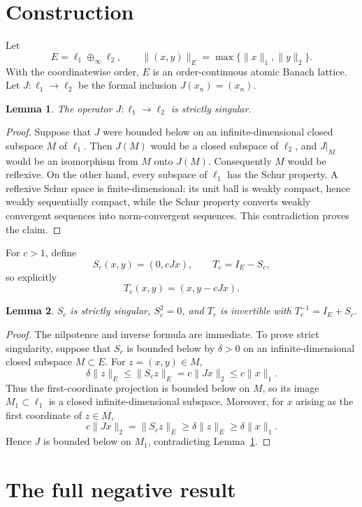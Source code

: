 \documentclass[11pt]{article}
\newtheorem{lemma}{Lemma}
\begin{document}
\section*{Construction}

Let
\[
  E=\ell_1\oplus_\infty\ell_2,
  \qquad
  \|(x,y)\|_E=\max\{\|x\|_1,\|y\|_2\}.
\]
With the coordinatewise order, $E$ is an order-continuous atomic Banach
lattice.  Let $J:\ell_1\to\ell_2$ be the formal inclusion
$J(x_n)=(x_n)$.

\begin{lemma}\label{lem:J}
The operator $J:\ell_1\to\ell_2$ is strictly singular.
\end{lemma}

\begin{proof}
Suppose that $J$ were bounded below on an infinite-dimensional closed
subspace $M$ of $\ell_1$.  Then $J(M)$ would be a closed subspace of
$\ell_2$, and $J|_M$ would be an isomorphism from $M$ onto $J(M)$.
Consequently $M$ would be reflexive.  On the other hand, every subspace of
$\ell_1$ has the Schur property.  A reflexive Schur space is
finite-dimensional: its unit ball is weakly compact, hence weakly
sequentially compact, while the Schur property converts weakly convergent
sequences into norm-convergent sequences.  This contradiction proves the
claim.
\end{proof}

For $c>1$, define
\[
  S_c(x,y)=(0,cJx),
  \qquad
  T_c=I_E-S_c,
\]
so explicitly
\[
  T_c(x,y)=(x,y-cJx).
\]

\begin{lemma}\label{lem:S}
$S_c$ is strictly singular, $S_c^2=0$, and $T_c$ is invertible with
$T_c^{-1}=I_E+S_c$.
\end{lemma}

\begin{proof}
The nilpotence and inverse formula are immediate.  To prove strict
singularity, suppose that $S_c$ is bounded below by $\delta>0$ on an
infinite-dimensional closed subspace $M\subset E$.  For $z=(x,y)\in M$,
\[
  \delta\|z\|_E
  \leq \|S_cz\|_E
  =c\|Jx\|_2
  \leq c\|x\|_1.
\]
Thus the first-coordinate projection is bounded below on $M$, so its image
$M_1\subset\ell_1$ is a closed infinite-dimensional subspace.  Moreover,
for $x$ arising as the first coordinate of $z\in M$,
\[
  c\|Jx\|_2=\|S_cz\|_E
  \geq\delta\|z\|_E
  \geq\delta\|x\|_1.
\]
Hence $J$ is bounded below on $M_1$, contradicting Lemma~\ref{lem:J}.
\end{proof}

\section*{The full negative result}
\end{document}
